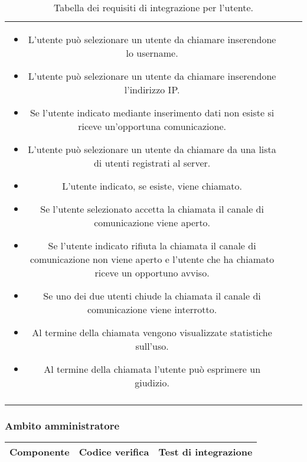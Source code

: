 {{\begin{table}[h!]
\begin{center}
\begin{minipage}{1\linewidth}
\begin{tabular}{c c c}
							\begin{minipage}{0.70\linewidth}
								\begin{itemize}
									\item L'utente può selezionare un utente da chiamare inserendone lo username.
									\item L'utente può selezionare un utente da chiamare inserendone l'indirizzo IP.
									\item Se l'utente indicato mediante inserimento dati non esiste si riceve un'opportuna comunicazione.
									\item L’utente può selezionare un utente da chiamare da una lista di utenti registrati al server. 
									\item L’utente indicato, se esiste, viene chiamato.
									\item Se l’utente selezionato accetta la chiamata il canale di comunicazione viene aperto.
									\item Se l’utente indicato rifiuta la chiamata il canale di comunicazione non viene aperto e l’utente 
									      che ha chiamato riceve un opportuno avviso.
									\item Se uno dei due utenti chiude la chiamata il canale di comunicazione viene interrotto.
									\item Al termine della chiamata vengono visualizzate statistiche sull'uso.
									\item Al termine della chiamata l'utente può esprimere un giudizio.
								\end{itemize}
							\end{minipage}	
							\\
							\\
							\bottomrule											
							\end{tabular}
						\end{minipage}
					
				\end{center}	
				\caption{Tabella dei requisiti di integrazione per l'utente.}
			\end{table}
		\newpage
		\subsubsection{Ambito amministratore}
			\begin{table}[h!]
					\begin{center}
					\scriptsize
							\begin{minipage}{1\linewidth}
								\begin{tabular}{c c c}				
								\toprule
								Componente & Codice verifica & Test di integrazione \\ 
								\midrule	
								

\end{tabular}
\end{minipage}
\end{center}
\end{table}}}
